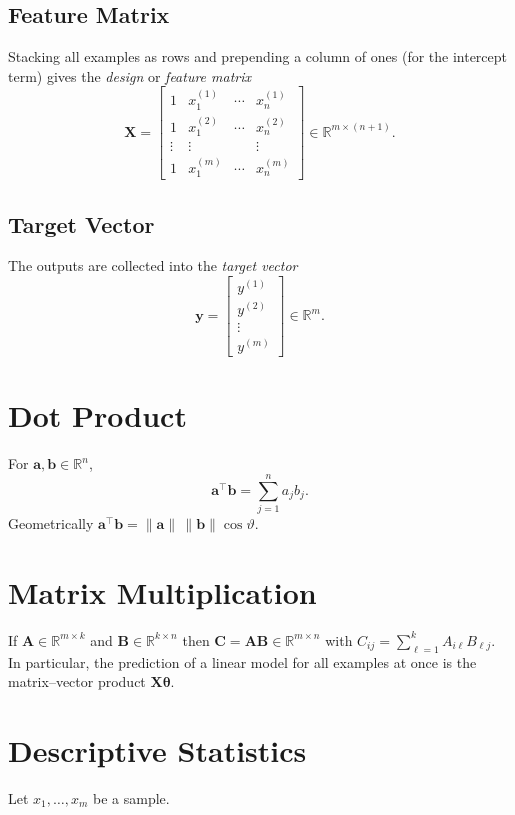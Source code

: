 \documentclass[11pt,a4paper]{report}
\theoremstyle{definition}
\theoremstyle{plain}
\theoremstyle{remark}
\newcommand{\R}{\mathbb{R}}
\newcommand{\vy}{\mathbf{y}}
\newcommand{\vw}{\bm{\theta}}          %
\newcommand{\Xmat}{\mathbf{X}}
\begin{document}
	\subsection{Feature Matrix}
	Stacking all examples as rows and prepending a column of ones (for the
	intercept term) gives the \emph{design} or \emph{feature matrix}
	\begin{equation}
		\Xmat=
		\begin{bmatrix}
			1 & x^{(1)}_1 & \cdots & x^{(1)}_n\\
			1 & x^{(2)}_1 & \cdots & x^{(2)}_n\\
			\vdots & \vdots & & \vdots\\
			1 & x^{(m)}_1 & \cdots & x^{(m)}_n
		\end{bmatrix}\in\R^{m\times(n+1)}.
		\label{eq:designmatrix}
	\end{equation}
	
	\subsection{Target Vector}
	The outputs are collected into the \emph{target vector}
	\[
	\vy=\begin{bmatrix}y^{(1)}\\y^{(2)}\\\vdots\\y^{(m)}\end{bmatrix}\in\R^{m}.
	\]
	
	\section{Dot Product}
	For $\mathbf{a},\mathbf{b}\in\R^{n}$,
	\[
	\mathbf{a}^{\!\top}\mathbf{b}=\sum_{j=1}^{n}a_j b_j .
	\]
	Geometrically $\mathbf{a}^{\!\top}\mathbf{b}=\|\mathbf{a}\|\,\|\mathbf{b}\|\cos\vartheta$.
	
	\section{Matrix Multiplication}
	If $\mathbf{A}\in\R^{m\times k}$ and $\mathbf{B}\in\R^{k\times n}$ then
	$\mathbf{C}=\mathbf{A}\mathbf{B}\in\R^{m\times n}$ with
	$C_{ij}=\sum_{\ell=1}^{k}A_{i\ell}B_{\ell j}$. In particular, the prediction of
	a linear model for all examples at once is the matrix--vector product
	$\Xmat\vw$.
	
	\section{Descriptive Statistics}
	Let $x_1,\dots,x_m$ be a sample.
	
\end{document}
